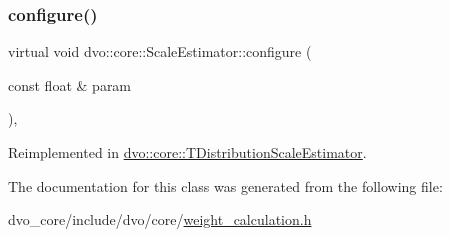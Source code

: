 \mbox{\label{classdvo_1_1core_1_1_scale_estimator_a58b5d7926b08e85e7393436156f3ef43}} 
\subsubsection{\texorpdfstring{configure()}{configure()}}
{\footnotesize\ttfamily virtual void dvo\+::core\+::\+Scale\+Estimator\+::configure (\begin{DoxyParamCaption}\item[{const float \&}]{param }\end{DoxyParamCaption})\hspace{0.3cm}{\ttfamily [inline]}, {\ttfamily [virtual]}}



Reimplemented in \mbox{\hyperlink{classdvo_1_1core_1_1_t_distribution_scale_estimator_a34ec79e7811c148606817510a00aa585}{dvo\+::core\+::\+T\+Distribution\+Scale\+Estimator}}.



The documentation for this class was generated from the following file\+:\begin{DoxyCompactItemize}
\item 
dvo\+\_\+core/include/dvo/core/\mbox{\hyperlink{weight__calculation_8h}{weight\+\_\+calculation.\+h}}\end{DoxyCompactItemize}
